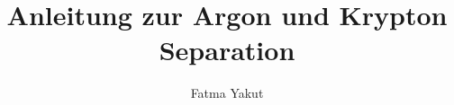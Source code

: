 \documentclass[fontsize=11pt, paper=a4, pagesize=auto, parskip=half, 
    titlepage=on, english]{scrartcl}
\begin{document}
    
\title{
  Anleitung zur Argon und Krypton Separation}

\author{
  Fatma Yakut
}


%




\end{document}
